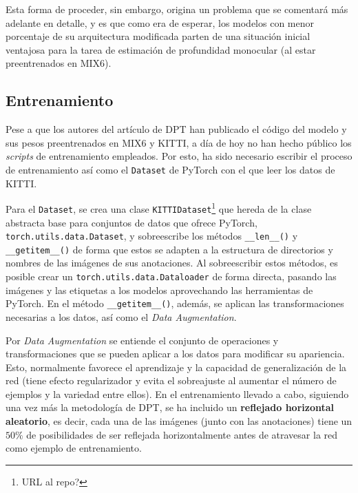 Esta forma de proceder, sin embargo, origina un problema que se comentará más adelante en detalle, y es que como era de esperar, los modelos con menor porcentaje de su arquitectura modificada parten de una situación inicial ventajosa para la tarea de estimación de profundidad monocular (al estar preentrenados en MIX6).

\subsection{Entrenamiento}
Pese a que los autores del artículo de DPT \cite{visiontransformersDPT} han publicado el código del modelo y sus pesos preentrenados en MIX6 y KITTI, a día de hoy no han hecho público los \textit{scripts} de entrenamiento empleados. Por esto, ha sido necesario escribir el proceso de entrenamiento así como el \texttt{Dataset} de PyTorch con el que leer los datos de KITTI.

Para el \texttt{Dataset}, se crea una clase \texttt{KITTIDataset}\footnote{URL al repo?} que hereda de la clase abstracta base para conjuntos de datos que ofrece PyTorch, \texttt{torch.utils.data.Dataset}, y sobreescribe los métodos \texttt{\_\_len\_\_()} y \texttt{\_\_getitem\_\_()} de forma que estos se adapten a la estructura de directorios y nombres de las imágenes de sus anotaciones. Al sobreescribir estos métodos, es posible crear un \texttt{torch.utils.data.Dataloader} de forma directa, pasando las imágenes y las etiquetas a los modelos aprovechando las herramientas de PyTorch. En el método \texttt{\_\_getitem\_\_()}, además, se aplican las transformaciones necesarias a los datos, así como el \textit{Data Augmentation}.

Por \textit{Data Augmentation} se entiende el conjunto de operaciones y transformaciones que se pueden aplicar a los datos para modificar su apariencia. Esto, normalmente favorece el aprendizaje y la capacidad de generalización de la red (tiene efecto regularizador y evita el sobreajuste al aumentar el número de ejemplos y la variedad entre ellos). En el entrenamiento llevado a cabo, siguiendo una vez más la metodología de DPT, se ha incluido un \textbf{reflejado horizontal aleatorio}, es decir, cada una de las imágenes (junto con las anotaciones) tiene un $50\%$ de posibilidades de ser reflejada horizontalmente antes de atravesar la red como ejemplo de entrenamiento.

